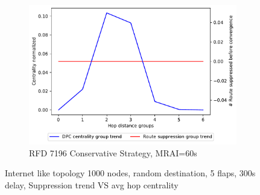 \begin{figure}[H]
\begin{subfigure}[b]{0.325\textwidth}
     \end{subfigure}
     \hfill
     \begin{subfigure}[b]{0.325\textwidth}
         \centering
         \includegraphics[width=\textwidth]{images/RFD/miceVSelephants/MultiMRAI/60/mice/cisco_1000_RFD_7196_conservative_nodeConvergence_centVSsup_trend.pdf}
         \caption{RFD 7196 Conservative Strategy, MRAI=60s}
         \label{fig:1000_7196RFDC_centVSsup_mices}
     \end{subfigure}
        \caption{Internet like topology 1000 nodes, random destination, 5 flaps, 300s delay, Suppression trend VS avg hop centrality}
        \label{fig:1000_RFD_centVSsup_mices}
\end{figure}

